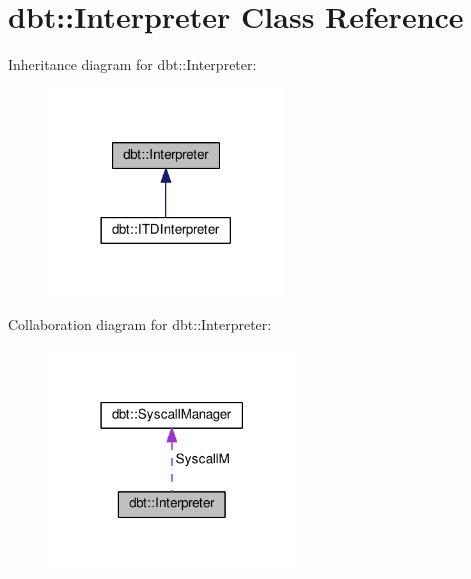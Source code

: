 \hypertarget{classdbt_1_1_interpreter}{}\section{dbt\+:\+:Interpreter Class Reference}
\label{classdbt_1_1_interpreter}


Inheritance diagram for dbt\+:\+:Interpreter\+:\nopagebreak
\begin{figure}[H]
\begin{center}
\leavevmode
\includegraphics[width=177pt]{classdbt_1_1_interpreter__inherit__graph}
\end{center}
\end{figure}


Collaboration diagram for dbt\+:\+:Interpreter\+:\nopagebreak
\begin{figure}[H]
\begin{center}
\leavevmode
\includegraphics[width=186pt]{classdbt_1_1_interpreter__coll__graph}
\end{center}
\end{figure}
